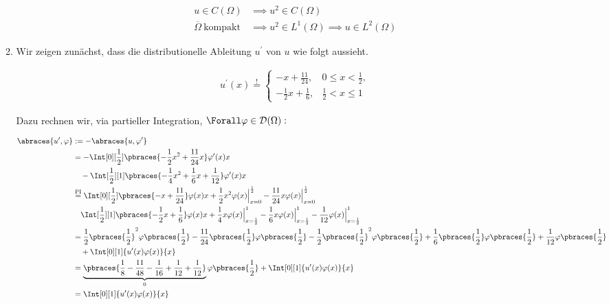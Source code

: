\begin{solution}
\begin{enumerate}[label = \arabic*.]
\begin{enumerate}[label = (\roman*)]
    \begin{align*}
      u \in C(\Omega) & \implies u^2 \in C(\Omega) \\
      \overline{\Omega} ~\text{kompakt}~ & \implies u^2 \in L^1(\Omega) \implies u \in L^2(\Omega)
    \end{align*}

    \item Wir zeigen zunächst, dass die distributionelle Ableitung $u^\prime$ von $u$ wie folgt aussieht.

    \begin{align*}
      u^\prime(x)
      \stackrel{!}{=}
      \begin{cases}
        -x + \frac{11}{24},           & 0 \leq x < \frac{1}{2}, \\
        -\frac{1}{2} x + \frac{1}{6}, & \frac{1}{2} < x \leq 1
      \end{cases}
    \end{align*}

    Dazu rechnen wir, via partieller Integration, $\Forall \varphi \in \mathcal{D}(\Omega):$

    \begin{align*}
      \abraces{u^\prime, \varphi}
      & :=
      -\abraces{u, \varphi^\prime} \\
      & =
      -\Int[0][\frac{1}{2}]{\pbraces{-\frac{1}{2} x^2 + \frac{11}{24} x} \varphi^\prime(x)}{x} \\
      & \quad
      -\Int[\frac{1}{2}][1]{\pbraces{-\frac{1}{4} x^2 + \frac{1}{6} x + \frac{1}{12}} \varphi^\prime(x)}{x} \\
      & \stackrel
      {
        \mathrm{PI}
      }{=}
      \Int[0][\frac{1}{2}]{\pbraces{-x + \frac{11}{24}} \varphi(x)}{x}
      +
      \frac{1}{2} x^2 \varphi(x) \Big |_{x=0}^{\frac{1}{2}}
      -
      \frac{11}{24} x \varphi(x) \Big |_{x=0}^{\frac{1}{2}} \\
      & \quad
      \Int[\frac{1}{2}][1]{\pbraces{-\frac{1}{2} x + \frac{1}{6}} \varphi(x)}{x}
      +
      \frac{1}{4} x \varphi(x) \Big |_{x=\frac{1}{2}}^1
      -
      \frac{1}{6} x \varphi(x) \Big |_{x=\frac{1}{2}}^1
      -
      \frac{1}{12} \varphi(x) \Big |_{x=\frac{1}{2}}^1 \\
      & =
      \frac{1}{2} \pbraces{\frac{1}{2}}^2 \varphi \pbraces{\frac{1}{2}} - \frac{11}{24} \pbraces{\frac{1}{2}} \varphi \pbraces{\frac{1}{2}}
      -
      \frac{1}{2} \pbraces{\frac{1}{2}}^2 \varphi \pbraces{\frac{1}{2}} + \frac{1}{6} \pbraces{\frac{1}{2}} \varphi \pbraces{\frac{1}{2}} + \frac{1}{12} \varphi \pbraces{\frac{1}{2}} \\
      & \quad
      +
      \Int[0][1]{u^\prime(x) \varphi(x)}{x} \\
      & =
      \underbrace
      {
        \pbraces
        {
          \frac{1}{8} - \frac{11}{48} - \frac{1}{16} + \frac{1}{12} + \frac{1}{12}
        }
      }_0
      \varphi \pbraces{\frac{1}{2}}
      +
      \Int[0][1]{u^\prime(x) \varphi(x)}{x} \\
      & =
      \Int[0][1]{u^\prime(x) \varphi(x)}{x}
    \end{align*}


\end{enumerate}
\end{enumerate}
\end{solution}
